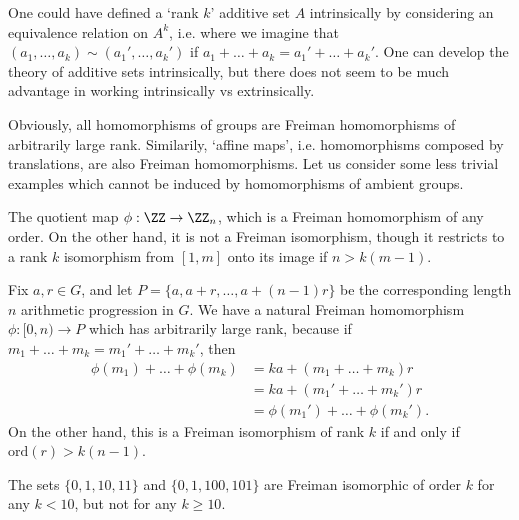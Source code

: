 \begin{remark}
    One could have defined a `rank $k$' additive set $A$ intrinsically by considering an equivalence relation on $A^k$, i.e. where we imagine that $(a_1,\dots,a_k) \sim (a_1',\dots,a_k')$ if $a_1 + \dots + a_k = a_1' + \dots + a_k'$. One can develop the theory of additive sets intrinsically, but there does not seem to be much advantage in working intrinsically vs extrinsically.
\end{remark}

Obviously, all homomorphisms of groups are Freiman homomorphisms of arbitrarily large rank. Similarily, `affine maps', i.e. homomorphisms composed by translations, are also Freiman homomorphisms. Let us consider some less trivial examples which cannot be induced by homomorphisms of ambient groups.

\begin{example}
    The quotient map $\phi: \ZZ \to \ZZ_n$, which is a Freiman homomorphism of any order. On the other hand, it is not a Freiman isomorphism, though it restricts to a rank $k$ isomorphism from $[1,m]$ onto its image if $n > k(m-1)$.
\end{example}

\begin{example}
    Fix $a,r \in G$, and let $P = \{ a, a+r, \dots, a + (n-1)r \}$ be the corresponding length $n$ arithmetic progression in $G$. We have a natural Freiman homomorphism $\phi: [0,n) \to P$ which has arbitrarily large rank, because if $m_1 + \dots + m_k = m_1' + \dots + m_k'$, then
    \begin{align*}
        \phi(m_1) + \dots + \phi(m_k) &= ka + (m_1 + \dots + m_k) r\\
        &= ka + (m_1' + \dots + m_k') r\\
        &= \phi(m_1') + \dots + \phi(m_k').
    \end{align*}
    On the other hand, this is a Freiman isomorphism of rank $k$ if and only if $\text{ord}(r) > k(n-1)$.
\end{example}

\begin{example}
    The sets $\{ 0,1,10,11 \}$ and $\{ 0,1,100,101 \}$ are Freiman isomorphic of order $k$ for any $k < 10$, but not for any $k \geq 10$.
\end{example}

